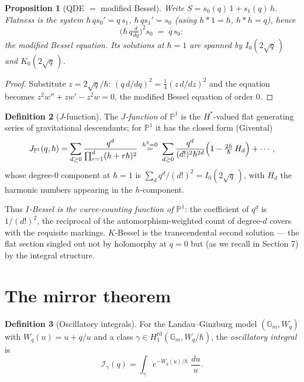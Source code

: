 \documentclass[11pt]{article}
\newtheorem{proposition}{Proposition}[section]
\theoremstyle{definition}
\newtheorem{definition}[proposition]{Definition}
\theoremstyle{remark}
\newcommand{\Gm}{\mathbb{G}_m}
\newcommand{\PP}{\mathbb{P}}
\newcommand{\rd}{\mathrm{rd}}
\newcommand{\hbarr}{\hbar}
\begin{document}
\begin{proposition}[QDE $=$ modified Bessel]\label{prop:qde}
Write $S = s_0(q)\,1 + s_1(q)\,h$. Flatness is the system
$\hbarr\,q s_0' = q\,s_1$, $\hbarr\,q s_1' = s_0$ (using
$h \ast 1 = h$, $h \ast h = q$), hence
\[
  \bigl(\hbarr\, q\tfrac{d}{dq}\bigr)^2 s_0 \;=\; q\,s_0 :
\]
the modified Bessel equation. Its solutions at $\hbarr = 1$ are
spanned by $I_0(2\sqrt q\,)$ and $K_0(2\sqrt q\,)$.
\end{proposition}

\begin{proof}
Substitute $z = 2\sqrt q/\hbarr$: $(q\,d/dq)^2 = \tfrac14
(z\,d/dz)^2$ and the equation becomes $z^2 w'' + z w' - z^2 w = 0$,
the modified Bessel equation of order $0$.
\end{proof}

\begin{definition}[$J$-function]
The \emph{$J$-function} of $\PP^1$ is the $H^\ast$-valued flat
generating series of gravitational descendants; for $\PP^1$ it has
the closed form (Givental)
\[
  J_{\PP^1}(q, \hbarr)
  = \sum_{d \ge 0} \frac{q^d}
    {\prod_{r=1}^{d}(h + r\hbarr)^2}
  \;\stackrel{h^2 = 0}{=}\;
  \sum_{d\ge0} \frac{q^d}{(d!)^2\hbarr^{2d}}
  \Bigl(1 - \tfrac{2h}{\hbarr}\,\mathstrut H_d\Bigr)
  + \cdots,
\]
whose degree-$0$ component at $\hbarr = 1$ is
$\sum_d q^d/(d!)^2 = I_0(2\sqrt q\,)$, with $H_d$ the harmonic
numbers appearing in the $h$-component.
\end{definition}

Thus \emph{$I$-Bessel is the curve-counting function of $\PP^1$}:
the coefficient of $q^d$ is $1/(d!)^2$, the reciprocal of the
automorphism-weighted count of degree-$d$ covers with the requisite
markings. $K$-Bessel is the transcendental second solution --- the
flat section singled out not by holomorphy at $q=0$ but (as we
recall in Section 7) by the integral structure.

\section{The mirror theorem}

\begin{definition}[Oscillatory integrals]
For the Landau--Ginzburg model $(\Gm, W_q)$ with
$W_q(u) = u + q/u$ and a class
$\gamma \in H_1^{\rd}(\Gm, W_q/\hbarr)$, the \emph{oscillatory
integral} is
\[
  \mathcal I_\gamma(q)
  = \int_\gamma e^{-W_q(u)/\hbarr}\;\frac{du}{u}.
\]
\end{definition}
\end{document}
